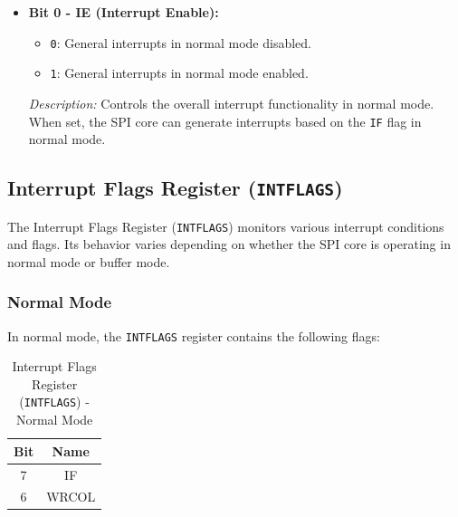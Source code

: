 \documentclass{article}
\begin{document}
\begin{itemize}
    \item \textbf{Bit 0 - IE (Interrupt Enable):} 
    \begin{itemize}
        \item \texttt{0}: General interrupts in normal mode disabled.
        \item \texttt{1}: General interrupts in normal mode enabled.
    \end{itemize}
    \textit{Description:} Controls the overall interrupt functionality in normal mode. When set, the SPI core can generate interrupts based on the \texttt{IF} flag in normal mode.
\end{itemize}

\subsection{Interrupt Flags Register (\texttt{INTFLAGS})}
\label{sec:intflags}

The Interrupt Flags Register (\texttt{INTFLAGS}) monitors various interrupt conditions and flags. Its behavior varies depending on whether the SPI core is operating in normal mode or buffer mode.

\subsubsection{Normal Mode}
In normal mode, the \texttt{INTFLAGS} register contains the following flags:

\begin{table}[H]
    \centering
    \caption{Interrupt Flags Register (\texttt{INTFLAGS}) - Normal Mode}
    \begin{tabular}{@{}cc@{}}
        \toprule
        \textbf{Bit} & \textbf{Name} \\ \midrule
        7 & IF \\
        6 & WRCOL \\ \bottomrule
    \end{tabular}
    \label{tab:intflags_normal}
\end{table}
\end{document}
